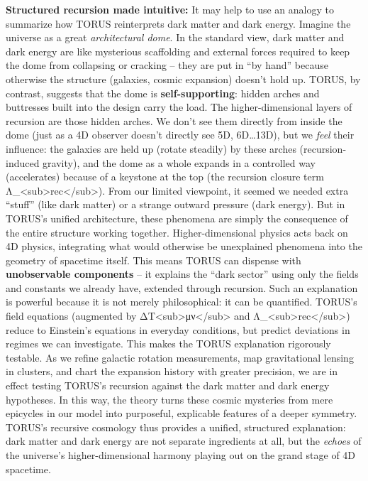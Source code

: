 \textbf{Structured recursion made intuitive:} It may help to use an
analogy to summarize how TORUS reinterprets dark matter and dark energy.
Imagine the universe as a great \emph{architectural dome}. In the
standard view, dark matter and dark energy are like mysterious
scaffolding and external forces required to keep the dome from
collapsing or cracking -- they are put in ``by hand'' because otherwise
the structure (galaxies, cosmic expansion) doesn't hold up. TORUS, by
contrast, suggests that the dome is \textbf{self-supporting}: hidden
arches and buttresses built into the design carry the load. The
higher-dimensional layers of recursion are those hidden arches. We don't
see them directly from inside the dome (just as a 4D observer doesn't
directly see 5D, 6D\ldots{}13D), but we \emph{feel} their influence: the
galaxies are held up (rotate steadily) by these arches
(recursion-induced gravity), and the dome as a whole expands in a
controlled way (accelerates) because of a keystone at the top (the
recursion closure term
Λ\_\textless{}sub\textgreater{}rec\textless{}/sub\textgreater{}). From
our limited viewpoint, it seemed we needed extra ``stuff'' (like dark
matter) or a strange outward pressure (dark energy). But in TORUS's
unified architecture, these phenomena are simply the consequence of the
entire structure working together. Higher-dimensional physics acts back
on 4D physics, integrating what would otherwise be unexplained phenomena
into the geometry of spacetime itself​. This means TORUS can dispense
with \textbf{unobservable components} -- it explains the ``dark sector''
using only the fields and constants we already have, extended through
recursion. Such an explanation is powerful because it is not merely
philosophical: it can be quantified. TORUS's field equations (augmented
by ΔT\textless{}sub\textgreater{}μν\textless{}/sub\textgreater{} and
Λ\_\textless{}sub\textgreater{}rec\textless{}/sub\textgreater{}) reduce
to Einstein's equations in everyday conditions, but predict deviations
in regimes we can investigate​. This makes the TORUS explanation
rigorously testable. As we refine galactic rotation measurements, map
gravitational lensing in clusters, and chart the expansion history with
greater precision, we are in effect testing TORUS's recursion against
the dark matter and dark energy hypotheses. In this way, the theory
turns these cosmic mysteries from mere epicycles in our model into
purposeful, explicable features of a deeper symmetry. TORUS's recursive
cosmology thus provides a unified, structured explanation: dark matter
and dark energy are not separate ingredients at all, but the
\emph{echoes} of the universe's higher-dimensional harmony playing out
on the grand stage of 4D spacetime.

